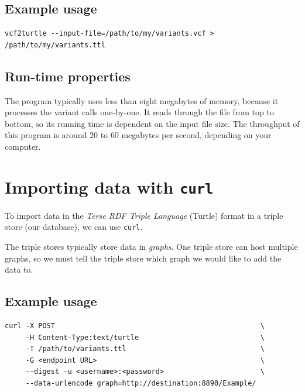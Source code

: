 \documentclass[11pt,a4paper,oneside]{book}
\begin{document}
\subsection{Example usage}

\begin{siderules}
\begin{verbatim}
vcf2turtle --input-file=/path/to/my/variants.vcf > /path/to/my/variants.ttl
\end{verbatim}
\end{siderules}

\subsection{Run-time properties}

  The program typically uses less than eight megabytes of memory, because it
  processes the variant calls one-by-one.  It reads through the file from top
  to bottom, so its running time is dependent on the input file size.  The
  throughput of this program is around $20$ to $60$ megabytes per second,
  depending on your computer.

\section{Importing data with \texttt{curl}}
\label{sec:curl}

  To import data in the \emph{Terse RDF Triple Language} (Turtle) format in
  a triple store (our database), we can use \texttt{curl}.

  The triple stores typically store data in \emph{graphs}.  One triple store
  can host multiple graphs, so we must tell the triple store which graph we
  would like to add the data to.

\subsection{Example usage}

\begin{siderules}
\begin{verbatim}
curl -X POST                                                 \
     -H Content-Type:text/turtle                             \
     -T /path/to/variants.ttl                                \
     -G <endpoint URL>                                       \
     --digest -u <username>:<password>                       \
     --data-urlencode graph=http://destination:8890/Example/
\end{verbatim}
\end{siderules}
\end{document}
